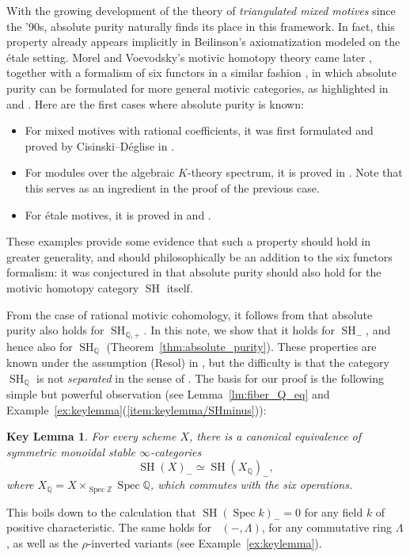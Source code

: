 \documentclass[JEP,XML,SOM,Unicode]{cedram}
\renewcommand{\AA}{\mathbb A}
\DeclareMathOperator{\SH}{SH}
\DeclareMathOperator{\DAminus}{D_{\AA^1,-}}
\DeclareMathOperator{\spec}{Spec}
\newcommand{\ZZ} {\mathbb Z}
\newcommand{\QQ} {\mathbb Q}
\newtheorem*{lmi}{Key Lemma}
\theoremstyle{remark}
\theoremstyle{definition}
\numberwithin{equation}{thm}
\begin{document}
With the growing development of the theory of \emph{triangulated mixed motives} since the '90s, absolute purity naturally finds its place in this framework.
In fact, this property already appears implicitly in Beilinson's axiomatization modeled on the étale setting. Morel and Voevodsky's motivic homotopy theory came later \cite{MV}, together with a formalism of six functors in a similar fashion \cite{AyoubThesis}, in which absolute purity can be formulated for more general motivic categories, as highlighted in \cite[A.2]{CDEtale} and \cite[4.3]{DJK}.
Here are the first cases where absolute purity is known:
\begin{itemize}
\item For mixed motives with rational coefficients, it was first formulated and proved by Cisinski--Déglise in \cite[Th.\,14.4.1]{CD3}.
\item For modules over the algebraic $K$-theory spectrum, it is proved in \cite[Th.\,13.6.3]{CD3}. Note that this serves as an ingredient in the proof of the previous case.
\item For étale motives, it is proved in \cite{AyoubEt} and \cite{CD5}.
\end{itemize}
These examples provide some evidence that such a property should hold in greater generality, and should philosophically be an addition to the six functors formalism: it was conjectured in \cite{DegliseOrientation} that absolute purity should also hold for the motivic homotopy category $\SH$ itself.

From the case of rational motivic cohomology, it follows from \cite[Th.\,16.2.13]{CD3} that absolute purity also holds for $\SH_{\QQ,+}$.
In this note, we show that it holds for $\SH_{-}$, and hence also for $\SH_{\QQ}$ (Theorem~\ref{thm:absolute_purity}).
These properties are known under the assumption (Resol) in \cite[2.4.1]{BD1}, but the difficulty is that the category $\SH_\QQ$ is not \emph{separated} in the sense of \cite[Def.\,2.1.7]{CD3}.
The basis for our proof is the following simple but powerful observation (see Lemma~\ref{lm:fiber_Q_eq} and Example~\ref{ex:keylemma}(\ref{item:keylemma/SHminus})):

\begin{lmi}
For every scheme $X$, there is a canonical equivalence of symmetric monoidal stable $\infty$-categories
\[
\SH(X)_- \simeq \SH(X_\QQ)_-,
\]
where $X_\QQ = X \times_{\spec{\ZZ}} \spec{\QQ}$, which commutes with the six operations.
\end{lmi}

This boils down to the calculation that $\SH(\spec{k})_- = 0$ for any field $k$ of positive characteristic.
The same holds for $\DAminus(-, \Lambda)$, for any commutative ring $\Lambda$, as well as the $\rho$-inverted variants (see Example~\ref{ex:keylemma}).
\end{document}
